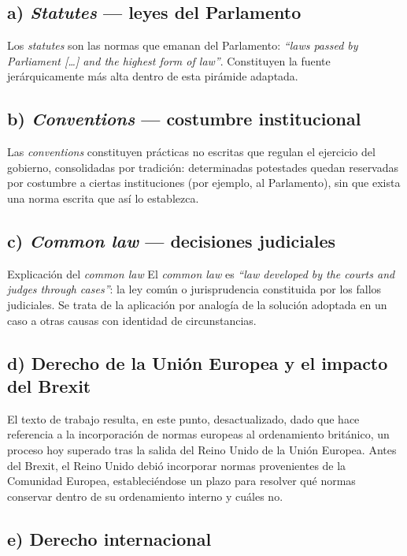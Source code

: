 \documentclass[12pt,oneside]{book}
\begin{document}
\subsection*{a) \emph{Statutes} --- leyes del Parlamento}

Los \emph{statutes} son las normas que emanan del Parlamento: \emph{``laws passed by Parliament [\ldots] and the highest form of law''}. Constituyen la fuente jerárquicamente más alta dentro de esta pirámide adaptada.

\subsection*{b) \emph{Conventions} --- costumbre institucional}

Las \emph{conventions} constituyen prácticas no escritas que regulan el ejercicio del gobierno, consolidadas por tradición: determinadas potestades quedan reservadas por costumbre a ciertas instituciones (por ejemplo, al Parlamento), sin que exista una norma escrita que así lo establezca.

\subsection*{c) \emph{Common law} --- decisiones judiciales}

\begin{example}{Explicación del \emph{common law}}
El \emph{common law} es \emph{``law developed by the courts and judges through cases''}: la ley común o jurisprudencia constituida por los fallos judiciales. Se trata de la aplicación por analogía de la solución adoptada en un caso a otras causas con identidad de circunstancias.
\end{example}

\subsection*{d) Derecho de la Unión Europea y el impacto del Brexit}

El texto de trabajo resulta, en este punto, desactualizado, dado que hace referencia a la incorporación de normas europeas al ordenamiento británico, un proceso hoy superado tras la salida del Reino Unido de la Unión Europea. Antes del Brexit, el Reino Unido debió incorporar normas provenientes de la Comunidad Europea, estableciéndose un plazo para resolver qué normas conservar dentro de su ordenamiento interno y cuáles no.

\subsection*{e) Derecho internacional}
\end{document}

